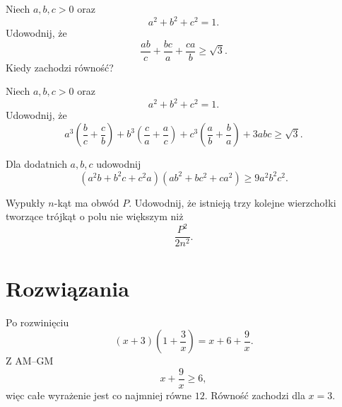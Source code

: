 \documentclass{lecture-kuznia}
\begin{document}
\begin{problem}\label{Z14}
	Niech $a,b,c>0$ oraz
	\[
		a^2+b^2+c^2=1.
	\]
	Udowodnij, że
	\[
		\frac{ab}{c}+\frac{bc}{a}+\frac{ca}{b}\ge\sqrt3.
	\]
	Kiedy zachodzi równość?
\end{problem}

\begin{problem}\label{Z15}
	Niech $a,b,c>0$ oraz
	\[
		a^2+b^2+c^2=1.
	\]
	Udowodnij, że
	\[
		a^3\left(\frac bc+\frac cb\right)
		+b^3\left(\frac ca+\frac ac\right)
		+c^3\left(\frac ab+\frac ba\right)
		+3abc
		\ge\sqrt3.
	\]
\end{problem}

\begin{problem}[$\redheart$]\label{Z16}
	Dla dodatnich $a,b,c$ udowodnij
	\[
		(a^2b+b^2c+c^2a)(ab^2+bc^2+ca^2)
		\ge 9a^2b^2c^2.
	\]
\end{problem}

\begin{problem}[$\redheart$]\label{Z17}
	Wypukły $n$-kąt ma obwód $P$. Udowodnij, że istnieją trzy kolejne
	wierzchołki tworzące trójkąt o polu nie większym niż
	\[
		\frac{P^2}{2n^2}.
	\]
\end{problem}




\ifshowsolutions

\newpage

\section{Rozwiązania}

\begin{solution*}[\ref{Z1}]
	Po rozwinięciu
	\[
		(x+3)\left(1+\frac3x\right)
		=x+6+\frac9x.
	\]
	Z AM--GM
	\[
		x+\frac9x\ge6,
	\]
	więc całe wyrażenie jest co najmniej równe $12$.
	Równość zachodzi dla $x=3$.
\end{solution*}
\end{document}
